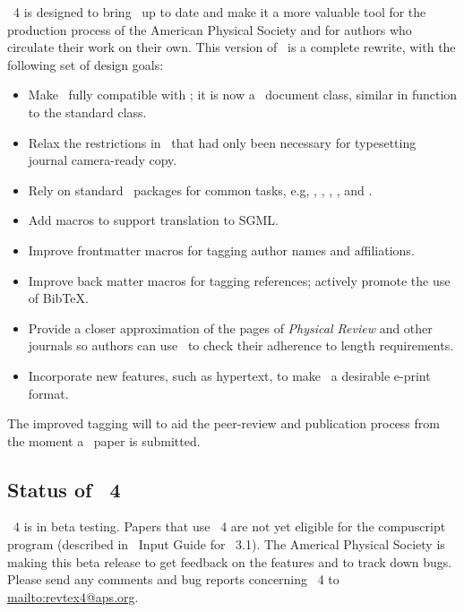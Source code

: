 \documentclass[%
prl%
,twocolumngrid%
,secnumarabic%
,amssymb]{revtex4}
\begin{document}
\revtex~4 is designed to
bring \revtex\ up to date and make
it a more valuable tool for the production process of the American Physical Society
and for authors who
circulate their work on their own.
This version of \revtex\ is a complete rewrite,
with the following set of design goals:

\begin{itemize}
\item
Make \revtex\ fully compatible with \LaTeXe; it is now
a \LaTeXe\ document class, similar in function to the standard  class.

\item
Relax the restrictions in \revtex\ that had only
been necessary for 
typesetting journal camera-ready copy.

\item
Rely on standard \LaTeXe\ packages for common tasks, e.g,
,
,
,
,
and
.

\item
Add macros to support translation to SGML.

\item
Improve frontmatter macros for tagging author names and affiliations.

\item
Improve back matter macros for tagging references;
actively promote the use of Bib\TeX.

\item
Provide a closer approximation of the pages of \emph{Physical Review} and other journals
so authors can use \revtex\ to check their adherence to length requirements.

\item
Incorporate new features, such as hypertext, to make \revtex\ a desirable e-print format.
\end{itemize}

The improved tagging will to aid the peer-review and
publication process from the moment a \revtex\ paper is submitted.

\subsection{Status of \revtex~4}
\revtex~4 is in beta testing. Papers that use \revtex~4 are not yet
eligible for the compuscript program (described in \revtex\ Input
Guide for \revtex~3.1).
The Americal Physical Society is making this beta
release to get feedback on the features and to track down bugs.
Please send any comments and bug reports concerning \revtex~4 to
\url{mailto:revtex4@aps.org}.
\end{document}
